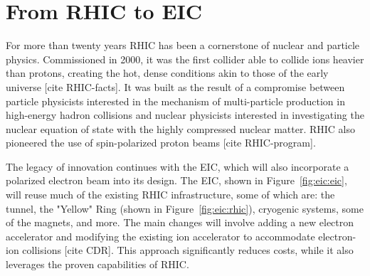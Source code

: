 \section{From RHIC to EIC}
For more than twenty years RHIC has been a cornerstone of nuclear and particle physics. Commissioned in 2000, it was the first collider able to collide ions heavier than protons, creating the hot, dense conditions akin to those of the early universe [cite RHIC-facts]. It was built as the result of a compromise between particle physicists interested in the mechanism of multi-particle production in high-energy hadron collisions and nuclear physicists interested in investigating the nuclear equation of state with the highly compressed nuclear matter. RHIC also pioneered the use of spin-polarized proton beams [cite RHIC-program].

The legacy of innovation continues with the EIC, which will also incorporate a polarized electron beam into its design. The EIC, shown in Figure~\ref{fig:eic:eic}, will reuse much of the existing RHIC infrastructure, some of which are: the tunnel, the "Yellow" Ring (shown in Figure~\ref{fig:eic:rhic}), cryogenic systems, some of the magnets, and more. The main changes will involve adding a new electron accelerator and modifying the existing ion accelerator to accommodate electron-ion collisions [cite CDR]. This approach significantly reduces costs, while it also leverages the proven capabilities of RHIC.

